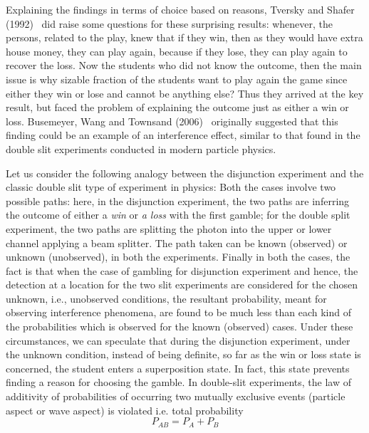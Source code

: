 \documentclass[review]{elsarticle}
\begin{document}
	Explaining the findings in terms of choice based on reasons, Tversky and Shafer (1992)~\cite{tversky1992choice} did raise some questions for these surprising results: whenever, the persons, related to the play, knew that if they win, then as they would have extra house money, they can play again, because if they lose, they can play again to recover the loss. Now the students who did not know the outcome, then the main issue is why sizable fraction of the students want to play again the game since either they win or lose and cannot be anything else? Thus they arrived at the key result, but faced the problem of explaining the outcome just as either a win or loss. Busemeyer, Wang and Townsand (2006)~\cite{busemeyer2006quantum} originally suggested that this finding could be an example of an interference effect, similar to that found in the double slit experiments conducted in modern particle physics. 

Let us consider the following analogy between the disjunction experiment and the classic double slit type of experiment in physics:
Both the cases involve two possible paths: here, in the disjunction experiment, the two paths are inferring the outcome of either a {\it win} or {\it a loss} with the first gamble; for the double split experiment, the two paths are splitting the photon into the upper or lower channel applying a beam splitter. The path taken can be known (observed) or unknown (unobserved), in both the experiments. Finally in both the cases, the fact is that when the case of gambling for disjunction experiment and hence, the detection at a location for the two slit experiments are considered for the chosen unknown, i.e., unobserved conditions, the resultant probability, meant for observing interference phenomena, are found to be much less than each kind of the probabilities which is observed for the known (observed) cases. Under these circumstances, we can speculate that during the disjunction experiment, under the unknown condition, instead of being definite, so far as the win or loss state is concerned, the student enters a superposition state. In fact, this state prevents finding a reason for choosing the gamble. In double-slit experiments, the law of additivity of probabilities of occurring two mutually exclusive events (particle aspect or wave aspect) is violated i.e. total probability
                                                 $$P_{AB} = P_A + P_B$$
																						
\end{document}
